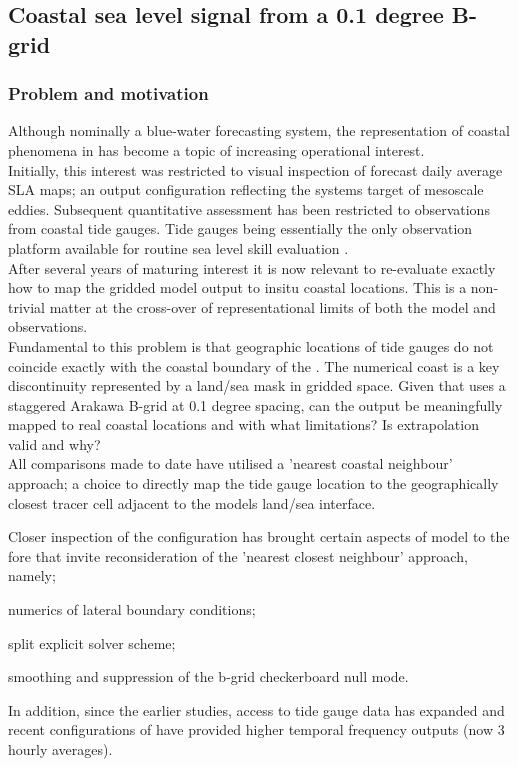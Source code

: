 \newpage
\subsection{Coastal sea level signal from a 0.1 degree B-grid \OGCM{}}
\label{S:plan_whichcell}
\subsubsection{Problem and motivation}

Although nominally a blue-water forecasting system, the representation of coastal phenomena in \BL{} has become a topic of increasing operational interest.\\
Initially, this interest was restricted to visual inspection of forecast daily average SLA maps; an  output configuration reflecting the systems target of mesoscale eddies.   Subsequent quantitative assessment \citep{Taylor:2010ud} has been restricted to observations from coastal tide gauges.  Tide gauges being essentially the only observation platform available for routine sea level skill evaluation \BL{}.\\



After several years of maturing interest it is now relevant to re-evaluate exactly how to map the gridded model output to insitu coastal locations. This is a non-trivial matter at the cross-over of representational limits of both the model and observations.\\
Fundamental to this problem is that geographic locations of tide gauges do not coincide exactly with the coastal boundary of the \OGCM{}.  The numerical coast is a key discontinuity represented by a land/sea mask in gridded space.  
\BoxBegin{}
Given that \BL{} uses a staggered Arakawa B-grid at 0.1 degree spacing, can the output be meaningfully mapped to real coastal locations and with what limitations? Is extrapolation valid and why?\\
\BoxEnd{}
All comparisons made to date have utilised a 'nearest coastal neighbour' approach; a choice to directly map the tide gauge location to the geographically closest tracer cell adjacent to the models land/sea interface.  



Closer inspection of the \BL{} configuration has brought certain aspects of model to the fore that invite reconsideration of the 'nearest closest neighbour' approach, namely;
\begin{inparaenum}[(a)]
\item numerics of lateral boundary conditions;
\item split explicit solver scheme;
\item smoothing and suppression of the b-grid checkerboard null mode.
\end{inparaenum}
In addition, since the earlier studies, access to tide gauge data has expanded and recent configurations of \BL{} have provided higher temporal frequency outputs (now 3 hourly averages).\\


